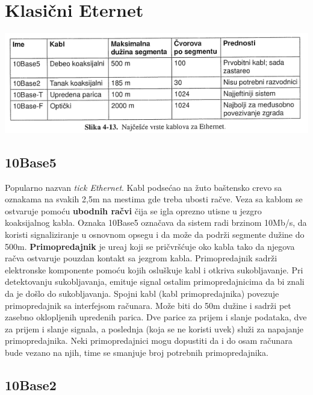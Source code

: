 \documentclass{article} %
\begin{document}
\section{Klasični Eternet}

\begin{center}
\includegraphics[scale=0.5]{vrsteKablova}
\end{center}

\subsection{10Base5}

Popularno nazvan \textit{tick Ethernet}. Kabl podse\'{c}ao na \v{z}uto ba\v{s}tensko crevo sa oznakama na svakih 2,5m na mestima gde treba ubosti ra\v{c}ve. Veza sa kablom se ostvaruje pomo\'{c}u \textbf{ubodnih ra\v{c}vi} \v{c}ija se igla oprezno utisne u jezgro koaksijalnog kabla. Oznaka 10Base5 ozna\v{c}ava da sistem radi brzinom 10Mb/s, da koristi signaliziranje u osnovnom opsegu i da mo\v{z}e da podr\v{z}i segmente du\v{z}ine do 500m. \textbf{Primopredajnik} je ure\dj{}aj koji se pri\v{c}vr\v{s}\'{c}uje oko kabla tako da njegova ra\v{c}va ostvaruje pouzdan kontakt sa jezgrom kabla. Primopredajnik sadr\v{z}i elektronske komponente pomo\'{c}u kojih oslu\v{s}kuje kabl i otkriva sukobljavanje. Pri detektovanju sukobljavanja, emituje signal ostalim primopredajnicima da bi znali da je do\v{s}lo do sukobljavanja. Spojni kabl (kabl primopredajnika) povezuje primopredajnik sa interfejsom ra\v{c}unara. Mo\v{z}e biti do 50m du\v{z}ine i sadr\v{z}i pet zasebno oklopljenih upredenih parica. Dve parice za prijem i slanje podataka, dve za prijem i slanje signala, a poslednja (koja se ne koristi uvek) slu\v{z}i za napajanje primopredajnika. Neki primopredajnici mogu dopustiti da i do osam ra\v{c}unara bude vezano na njih, time se smanjuje broj potrebnih primopredajnika.

\subsection{10Base2}
\end{document}
